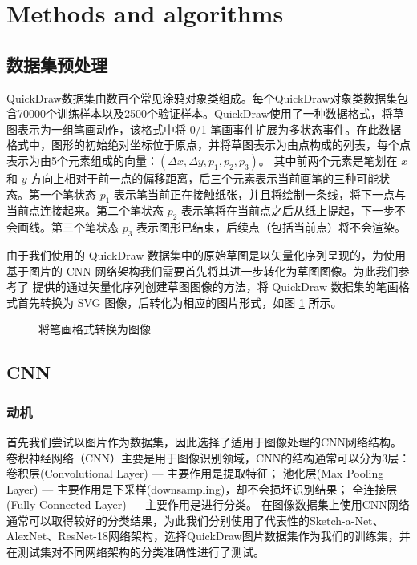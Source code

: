 \section{Methods and algorithms}\label{sec:methods}
\subsection{数据集预处理}
QuickDraw数据集\cite{sketchrnn}由数百个常见涂鸦对象类组成。每个QuickDraw对象类数据集包含70000个训练样本以及2500个验证样本。QuickDraw使用了一种数据格式，将草图表示为一组笔画动作，该格式中将 0/1 笔画事件扩展为多状态事件。在此数据格式中，图形的初始绝对坐标位于原点，并将草图表示为由点构成的列表，每个点表示为由5个元素组成的向量：$(\Delta x, \Delta y, p_1, p_2, p_3)$。
其中前两个元素是笔划在 $x$ 和 $y$ 方向上相对于前一点的偏移距离，后三个元素表示当前画笔的三种可能状态。第一个笔状态 $p_1$ 表示笔当前正在接触纸张，并且将绘制一条线，将下一点与当前点连接起来。第二个笔状态 $p_2$ 表示笔将在当前点之后从纸上提起，下一步不会画线。第三个笔状态 $p_3$ 表示图形已结束，后续点（包括当前点）将不会渲染。

由于我们使用的 QuickDraw 数据集中的原始草图是以矢量化序列呈现的，为使用基于图片的 CNN 网络架构我们需要首先将其进一步转化为草图图像。为此我们参考了 \parencite{pix2seq} 提供的通过矢量化序列创建草图图像的方法，将 QuickDraw 数据集的笔画格式首先转换为 SVG 图像，后转化为相应的图片形式，如图 \ref{fig:seq2png} 所示。

\begin{figure}[ht]
    \centering
    
    \caption{将笔画格式转换为图像}
    \label{fig:seq2png}
\end{figure}


\subsection{CNN}

\subsubsection{动机}
首先我们尝试以图片作为数据集，因此选择了适用于图像处理的CNN网络结构。卷积神经网络（CNN）主要是用于图像识别领域，CNN的结构通常可以分为3层：
卷积层(Convolutional Layer) --- 主要作用是提取特征；
池化层(Max Pooling Layer) --- 主要作用是下采样(downsampling)，却不会损坏识别结果；
全连接层(Fully Connected Layer) --- 主要作用是进行分类。
在图像数据集上使用CNN网络通常可以取得较好的分类结果，为此我们分别使用了代表性的Sketch-a-Net、AlexNet、ResNet-18网络架构，选择QuickDraw图片数据集作为我们的训练集，并在测试集对不同网络架构的分类准确性进行了测试。

